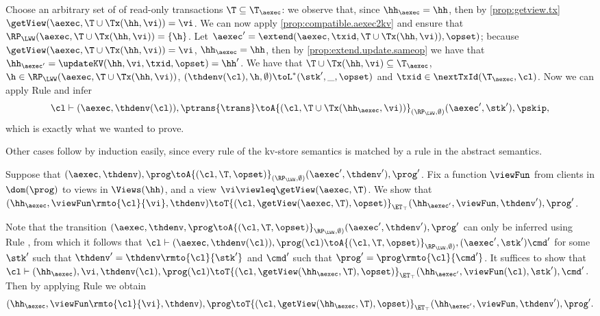 Choose an arbitrary set of of read-only transactions $\T \subseteq \T_{\aexec}$: 
we observe that, since $\hh_{\aexec} = \hh$, then  by \cref{prop:getview.tx} $\getView(\aexec, \T \cup \Tx(\hh, \vi)) = \vi$. 
We can now apply \cref{prop:compatible.aexec2kv} and ensure that $\RP_{\LWW}(\aexec, \T \cup \Tx(\hh, \vi)) = \{\h\}$.
Let $\aexec' = \extend(\aexec, \txid, \T \cup \Tx(\hh, \vi)), \opset)$; because $\getView(\aexec, \T \cup \Tx(\hh, \vi)) = \vi$, 
$\hh_{\aexec} = \hh$,
then by \cref{prop:extend.update.sameop} we have that $\hh_{\aexec'} = \updateKV(\hh, \vi, \txid, \opset) = \hh'$. 
We  have that $\T \cup \Tx(\hh, \vi) \subseteq \T_{\aexec}$, $\h \in \RP_{\LWW}(\aexec, \T \cup \Tx(\hh, \vi))$,
$(\thdenv(\cl), \h, \emptyset) \toL^{\ast} (\stk', \_, \opset)$ and $\txid \in \nextTxId(\T_{\aexec}, \cl)$. 
Now we can apply Rule  and infer
\[
\cl \vdash (\aexec, \thdenv(\cl)), \ptrans{\trans} \toA{(\cl, \T \cup \Tx(\hh_{\aexec}, \vi))}_{(\RP_{\LWW}, \emptyset)} 
(\aexec', \stk'), \pskip,
\]
which is exactly what we wanted to prove. 

\ac{Other cases follow by induction easily, since every rule of the kv-store semantics is 
matched by a rule in the abstract semantics.}

Suppose that $(\aexec, \thdenv), \prog \toA{(\cl, \T, \opset)}_{(\RP_{\LWW}, \emptyset)} (\aexec', \thdenv'), \prog'$. 
Fix a function $\viewFun$ from clients in $\dom(\prog)$ to views in $\Views(\hh)$, and a view $\vi \viewleq \getView(\aexec, \T)$.
We show that 
$(\hh_{\aexec}, \viewFun\rmto{\cl}{\vi}, \thdenv) \toT{(\cl, \getView(\aexec, \T), \opset)}_{\ET_{\top}} (\hh_{\aexec'}, 
\viewFun, \thdenv'), \prog'$. 

Note that the transition $(\aexec, \thdenv, \prog \toA{(\cl, \T, \opset)}_{\RP_{\LWW}, \emptyset)} (\aexec', \thdenv'), \prog'$ 
can only be inferred using Rule , from which it follows that $\cl \vdash (\aexec, \thdenv(\cl)), \prog(\cl) 
\toA{(\cl, \T, \opset)}_{\RP_{\LWW}, \emptyset)}, (\aexec' ,\stk') \cmd'$ for some $\stk'$ such that $\thdenv' = 
\thdenv\rmto{\cl}{\stk'}$ and $\cmd'$ such that $\prog' = \prog\rmto{\cl}{\cmd'}$.
It suffices to show that $\cl \vdash (\hh_{\aexec}), \vi, \thdenv(\cl), \prog(\cl) \toT{(\cl, \getView(\hh_{\aexec}, \T), \opset)}_{\ET_{\top}} 
(\hh_{\aexec'}, \viewFun(\cl), \stk'), \cmd'$. Then by applying Rule  we obtain 
\[
(\hh_{\aexec}, \viewFun\rmto{\cl}{\vi}, \thdenv), \prog \toT{(\cl, \getView(\hh_{\aexec}, \T), \opset)}_{\ET_{\top}} 
(\hh_{\aexec'}, \viewFun, \thdenv'), \prog'.
\]

